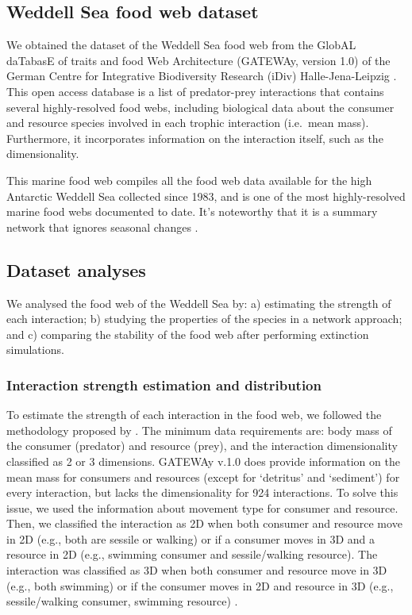 \documentclass[gc, manuscript]{copernicus}
\begin{document}
\subsection{Weddell Sea food web dataset}

We obtained the dataset of the Weddell Sea food web from the GlobAL
daTabasE of traits and food Web Architecture (GATEWAy, version 1.0) of
the German Centre for Integrative Biodiversity Research (iDiv)
Halle-Jena-Leipzig \citep{Brose2018}. This open access database is a
list of predator-prey interactions that contains several highly-resolved
food webs, including biological data about the consumer and resource
species involved in each trophic interaction (i.e.~mean mass).
Furthermore, it incorporates information on the interaction itself, such
as the dimensionality.

This marine food web compiles all the food web data available for the
high Antarctic Weddell Sea collected since 1983, and is one of the most
highly-resolved marine food webs documented to date. It's noteworthy
that it is a summary network that ignores seasonal changes
\citep{Jacob2011}.

\subsection{Dataset analyses}

We analysed the food web of the Weddell Sea by: a) estimating the
strength of each interaction; b) studying the properties of the species
in a network approach; and c) comparing the stability of the food web
after performing extinction simulations.

\subsubsection{Interaction strength estimation and distribution}

To estimate the strength of each interaction in the food web, we
followed the methodology proposed by \citet{Pawar2012}. The minimum data
requirements are: body mass of the consumer (predator) and resource
(prey), and the interaction dimensionality classified as 2 or 3
dimensions. GATEWAy v.1.0 does provide information on the mean mass for
consumers and resources (except for `detritus' and `sediment') for every
interaction, but lacks the dimensionality for 924 interactions. To solve
this issue, we used the information about movement type for consumer and
resource. Then, we classified the interaction as 2D when both consumer
and resource move in 2D (e.g., both are sessile or walking) or if a
consumer moves in 3D and a resource in 2D (e.g., swimming consumer and
sessile/walking resource). The interaction was classified as 3D when
both consumer and resource move in 3D (e.g., both swimming) or if the
consumer moves in 2D and resource in 3D (e.g., sessile/walking consumer,
swimming resource) \citep{Pawar2012}.
\end{document}
